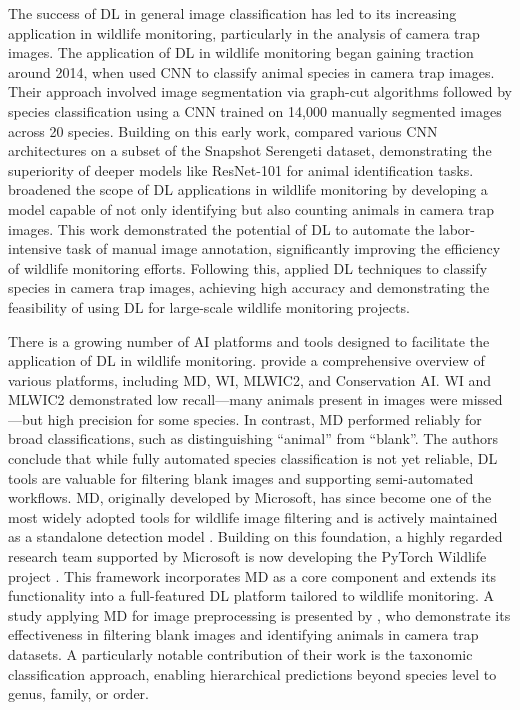 The success of \ac{DL} in general image classification has led to its increasing application in wildlife monitoring, particularly in the analysis of camera trap images.
The application of \ac{DL} in wildlife monitoring began gaining traction around 2014, when \textcite{chenDeepConvolutionalNeural2014} used \ac{CNN} to classify animal species in camera trap images.
Their approach involved image segmentation via graph-cut algorithms followed by species classification using a \ac{CNN} trained on 14,000 manually segmented images across 20 species.
Building on this early work, \textcite{gomezvillaAutomaticWildAnimal2017} compared various \ac{CNN} architectures on a subset of the Snapshot Serengeti dataset, demonstrating the superiority of deeper models like ResNet-101 for animal identification tasks.
\textcite{norouzzadehAutomaticallyIdentifyingCounting2018} broadened the scope of \ac{DL} applications in wildlife monitoring by developing a model capable of not only identifying but also counting animals in camera trap images.
This work demonstrated the potential of \ac{DL} to automate the labor-intensive task of manual image annotation, significantly improving the efficiency of wildlife monitoring efforts.
Following this, \textcite{tabakMachineLearningClassify2019} applied \ac{DL} techniques to classify species in camera trap images, achieving high accuracy and demonstrating the feasibility of using \ac{DL} for large-scale wildlife monitoring projects.

There is a growing number of \ac{AI} platforms and tools designed to facilitate the application of \ac{DL} in wildlife monitoring.
\textcite{velezChoosingAppropriatePlatform2022} provide a comprehensive overview of various platforms, including \ac{MD}, \ac{WI}, \ac{MLWIC2}, and Conservation \ac{AI}.
\ac{WI} and \ac{MLWIC2} demonstrated low recall—many animals present in images were missed—but high precision for some species.
In contrast, \ac{MD} performed reliably for broad classifications, such as distinguishing \enquote{animal} from \enquote{blank}.
The authors conclude that while fully automated species classification is not yet reliable, \ac{DL} tools are valuable for filtering blank images and supporting semi-automated workflows.
\ac{MD}, originally developed by Microsoft, has since become one of the most widely adopted tools for wildlife image filtering and is actively maintained as a standalone detection model \autocite{morrisEfficientPipelineCamera2025}.
Building on this foundation, a highly regarded research team supported by Microsoft is now developing the PyTorch Wildlife project \autocite{hernandezPytorchWildlifeCollaborativeDeep2024}.
This framework incorporates \ac{MD} as a core component and extends its functionality into a full-featured \ac{DL} platform tailored to wildlife monitoring.
A study applying \ac{MD} for image preprocessing is presented by \textcite{schneiderRecognitionEuropeanMammals2024}, who demonstrate its effectiveness in filtering blank images and identifying animals in camera trap datasets.
A particularly notable contribution of their work is the taxonomic classification approach, enabling hierarchical predictions beyond species level to genus, family, or order.

